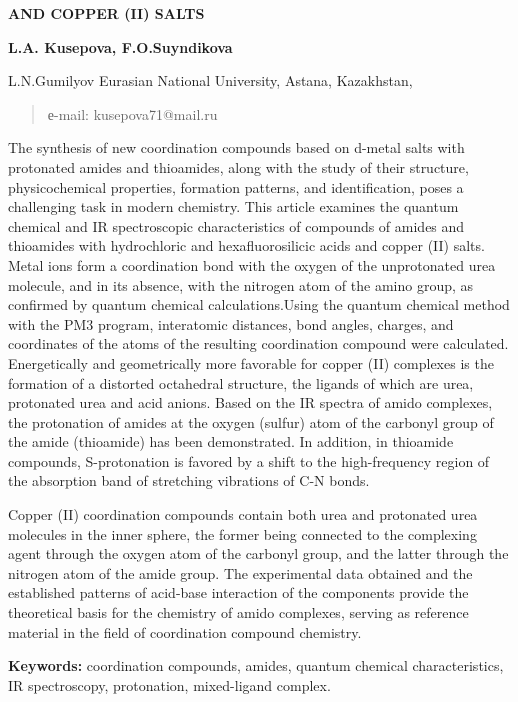 \textbf{AND COPPER (II) SALTS}

\textbf{L.A. Kusepova, F.O.Suyndikova}

L.N.Gumilyov Eurasian National University, Astana, Kazakhstan,

\begin{quote}
е-mail: kusepova71@mail.ru
\end{quote}

The synthesis of new coordination compounds based on d-metal salts with
protonated amides and thioamides, along with the study of their
structure, physicochemical properties, formation patterns, and
identification, poses a challenging task in modern chemistry. This
article examines the quantum chemical and IR spectroscopic
characteristics of compounds of amides and thioamides with hydrochloric
and hexafluorosilicic acids and copper (II) salts. Metal ions form a
coordination bond with the oxygen of the unprotonated urea molecule, and
in its absence, with the nitrogen atom of the amino group, as confirmed
by quantum chemical calculations.Using the quantum chemical method with
the PM3 program, interatomic distances, bond angles, charges, and
coordinates of the atoms of the resulting coordination compound were
calculated. Energetically and geometrically more favorable for copper
(II) complexes is the formation of a distorted octahedral structure, the
ligands of which are urea, protonated urea and acid anions. Based on the
IR spectra of amido complexes, the protonation of amides at the oxygen
(sulfur) atom of the carbonyl group of the amide (thioamide) has been
demonstrated. In addition, in thioamide compounds, S-protonation is
favored by a shift to the high-frequency region of the absorption band
of stretching vibrations of C-N bonds.

Copper (II) coordination compounds contain both urea and protonated urea
molecules in the inner sphere, the former being connected to the
complexing agent through the oxygen atom of the carbonyl group, and the
latter through the nitrogen atom of the amide group. The experimental
data obtained and the established patterns of acid-base interaction of
the components provide the theoretical basis for the chemistry of amido
complexes, serving as reference material in the field of coordination
compound chemistry.

\textbf{Keywords:} coordination compounds, amides, quantum chemical
characteristics, IR spectroscopy, protonation, mixed-ligand complex.

